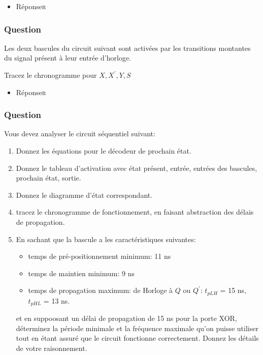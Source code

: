 \documentclass[11pt]{article}
\begin{document}
\begin{itemize}
\item Réponse\hfill{}\textsc{r}
\label{sec:org34b8998}
\end{itemize}

\subsubsection*{Question}
\label{sec:org4a97dd0}
Les deux bascules du circuit suivant sont activées par les
   transitions montantes du signal présent à leur entrée
   d'horloge. 
   \begin{center}

\end{center}

Tracez le chronogramme pour \(X, X^\prime, Y, S\)

\begin{itemize}
\item Réponse\hfill{}\textsc{r}
\label{sec:org8eb913e}
\end{itemize}

\subsubsection*{Question}
\label{sec:org73232ac}
Vous devez analyser le circuit séquentiel suivant:
\begin{center}

\end{center}

\begin{enumerate}
\item Donnez les équations pour le décodeur de prochain état.

\item Donnez le tableau d'activation avec état présent, entrée, entrées
des bascules, prochain état, sortie.

\item Donnez le diagramme d'état correspondant.

\item tracez le chronogramme de fonctionnement, en
faisant abstraction des délais de propagation.

\item En sachant que la bascule a les caractéristiques suivantes:

\begin{itemize}
\item temps de pré-positionnement minimum: 11 ns

\item temps de maintien minimum: 9 ns

\item temps de propagation maximum: de Horloge à \(Q\) ou
\(Q^{\prime}\): \(t_{pLH}\) = 15 ns, \(t_{pHL}\) = 13 ns.
\end{itemize}

et en suppoosant un délai de propagation de 15 ns pour la porte
XOR, déterminez la période minimale et la fréquence
maximale qu'on puisse utiliser tout en étant assuré que le circuit
fonctionne correctement. Donnez les détails de votre raisonnement.
\end{enumerate}
\end{document}
